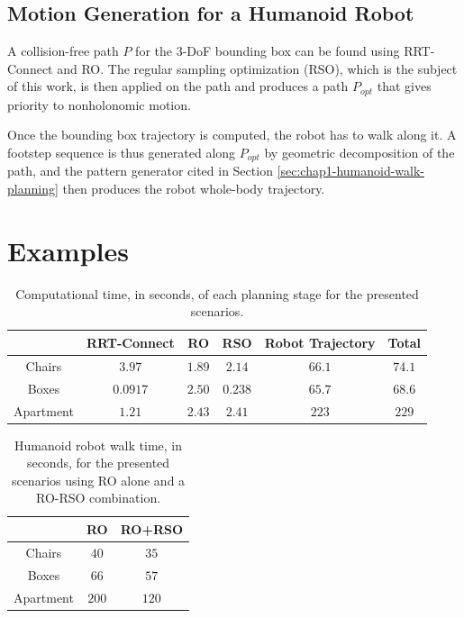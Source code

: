 \subsection{Motion Generation for a Humanoid Robot}

A collision-free path $P$ for the 3-DoF bounding box can be found
using RRT-Connect and RO. The regular sampling optimization (RSO),
which is the subject of this work, is then applied on the path and
produces a path $P_{opt}$ that gives priority to nonholonomic motion.

Once the bounding box trajectory is computed, the robot has to walk
along it. A footstep sequence is thus generated along $P_{opt}$ by
geometric decomposition of the path, and the pattern generator cited
in Section \ref{sec:chap1-humanoid-walk-planning} then produces the
robot whole-body trajectory.

\section{Examples}
\label{sec:chap1-examples}

\begin{table}
\centering
\begin{tabular}{c|c|c|c|c|c|}
  \cline{2-6}
  & RRT-Connect & RO & RSO & Robot Trajectory & Total\\
  \hline
  \multicolumn{1}{|c|}{Chairs} & $3.97$ & $1.89$ & $2.14$ & $66.1$ & $74.1$\\
  \hline
  \multicolumn{1}{|c|}{Boxes} & $0.0917$ & $2.50$ & $0.238$ & $65.7$ & $68.6$\\
  \hline
  \multicolumn{1}{|c|}{Apartment} & $1.21$ & $2.43$ & $2.41$ & $223$ & $229$ \\
  \hline
\end{tabular}
\caption{Computational time, in seconds, of each planning stage for
  the presented scenarios.}
\label{tab:chap1-computation-time}
\end{table}

\begin{table}
\centering
\begin{tabular}{c|c|c|}
  \cline{2-3}
  & RO & RO+RSO \\
  \hline
  \multicolumn{1}{|c|}{Chairs} & $40$ & $35$ \\
  \hline
  \multicolumn{1}{|c|}{Boxes} & $66$ & $57$ \\
  \hline
  \multicolumn{1}{|c|}{Apartment} & $200$ & $120$ \\
  \hline
\end{tabular}
\caption{Humanoid robot walk time, in seconds, for the presented
  scenarios using RO alone and a RO-RSO combination.}
\label{tab:chap1-walk-time}
\end{table}

